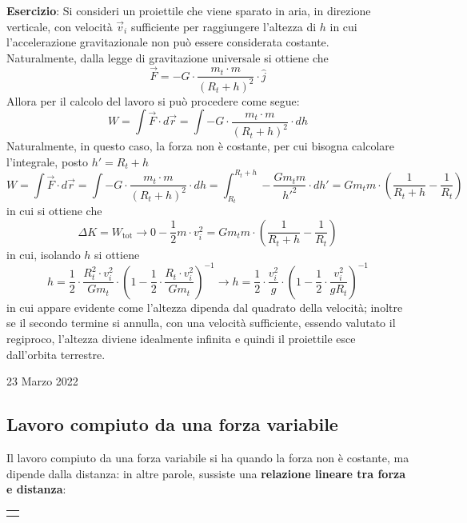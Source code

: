 \documentclass[a4paper]{extarticle}
\begin{document}
\vspace{1em}
\noindent
\textbf{Esercizio}: Si consideri un proiettile che viene sparato in aria, in direzione verticale, con velocità $\vec v_i$ sufficiente per raggiungere l'altezza di $h$ in cui l'accelerazione gravitazionale non può essere considerata costante.\\
Naturalmente, dalla legge di gravitazione universale si ottiene che
\[\vec F = - G \cdot \frac{m_t \cdot m}{(R_t + h)^2} \cdot \hat{j}\]
Allora per il calcolo del lavoro si può procedere come segue:
\[W=\int \vec F \cdot d \vec r = \int -G \cdot \frac{m_t \cdot m}{(R_t + h)^2} \cdot dh\]
Naturalmente, in questo caso, la forza non è costante, per cui bisogna calcolare l'integrale, posto $h'=R_t+h$
\[W=\int \vec F \cdot d \vec r = \int -G \cdot \frac{m_t \cdot m}{(R_t + h)^2} \cdot dh = \int_{R_t}^{R_t+h} - \frac{G m_t m}{{h'}^2} \cdot dh' = G m_t m \cdot \left(\frac{1}{R_t+h}-\frac{1}{R_t}\right)\]
in cui si ottiene che
\[\Delta K = W_{\text{tot}} \longrightarrow 0 - \frac{1}{2}m \cdot v_i^2 = G m_t m \cdot \left(\frac{1}{R_t+h}-\frac{1}{R_t}\right)\]
in cui, isolando $h$ si ottiene
\[h = \frac{1}{2} \cdot \frac{R_t^2 \cdot v_i^2}{G m_t} \cdot \left(1 - \frac{1}{2} \cdot \frac{R_t \cdot v_i^2}{G m_t} \right)^{-1} \longrightarrow h = \frac{1}{2} \cdot \frac{v_i^2}{g} \cdot \left(1 - \frac{1}{2} \cdot \frac{v_i^2}{g R_t} \right)^{-1}\]
in cui appare evidente come l'altezza dipenda dal quadrato della velocità; inoltre se il secondo termine si annulla, con una velocità sufficiente, essendo valutato il regiproco, l'altezza diviene idealmente infinita e quindi il proiettile esce dall'orbita terrestre.

\newpage
\noindent
\begin{center}
  23 Marzo 2022
\end{center}
\subsection{Lavoro compiuto da una forza variabile}
Il lavoro compiuto da una forza variabile si ha quando la forza non è costante, ma dipende dalla distanza: in altre parole, sussiste una \textbf{relazione lineare tra forza e distanza}:


\vspace{2em}
\noindent
{}
\begin{tabularx}{\textwidth}{P}
  {
      \centering
    }
\end{tabularx}
\end{document}
